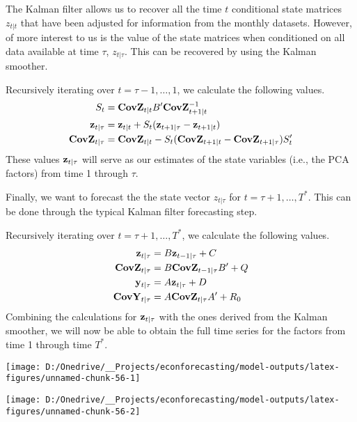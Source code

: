 \documentclass[11pt, letterpaper]{article}\usepackage[]{graphicx}\usepackage[]{color}
\newcommand{\vv}[1]{\textcolor{black}{\mathbf{#1}}}
\begin{document}
The Kalman filter allows us to recover all the time $t$ conditional state matrices $z_{t|t}$ that have been adjusted for information from the monthly datasets. However, of more interest to us is the value of the state matrices when conditioned on all data available at time $\tau$, $z_{t|\tau}$. This can be recovered by using the Kalman smoother.

Recursively iterating over $t = \tau - 1, \dots, 1$, we calculate the following values. 
\begin{align*}
	S_{t} &= \vv{CovZ}_{t|t} B' \vv{CovZ}^{-1}_{t + 1|t}\\
	\vv{z}_{t|\tau} &= \vv{z}_{t|t} + S_t (\vv{z}_{t+1|\tau} - \vv{z}_{t + 1|t})\\
	\vv{CovZ}_{t|\tau} &= \vv{CovZ}_{t|t} - S_t(\vv{CovZ}_{t + 1|t} - \vv{CovZ}_{t + 1|\tau})S'_t
\end{align*}
These values $\vv{z}_{t|\tau}$ will serve as our estimates of the state variables (i.e., the PCA factors) from time 1 through $\tau$.

Finally, we want to forecast the the state vector $z_{t|\tau}$ for $t = \tau + 1, \dots, T^*$. This can be done through the typical Kalman filter forecasting step.

Recursively iterating over $t = \tau + 1, \dots, T^*$, we calculate the following values.
\begin{align*}
	\vv{z}_{t|\tau} &= B \vv{z}_{t-1|\tau} + C\\
	\vv{CovZ}_{t|\tau} &= B \vv{CovZ}_{t-1|\tau} B'+ Q\\
	\vv{y}_{t|\tau} &= A \vv{z}_{t|\tau} + D\\
	\vv{CovY}_{t|\tau} &= A \vv{CovZ}_{t|\tau} A' + R_0
\end{align*}
Combining the calculations for $\vv{z}_{t|\tau}$ with the ones derived from the Kalman smoother, we will now be able to obtain the full time series for the factors from time 1 through time $T^*$.



{\centering \texttt{[image: D:/Onedrive/\_\_Projects/econforecasting/model-outputs/latex-figures/unnamed-chunk-56-1]} 

}




{\centering \texttt{[image: D:/Onedrive/\_\_Projects/econforecasting/model-outputs/latex-figures/unnamed-chunk-56-2]} 

}
\end{document}
